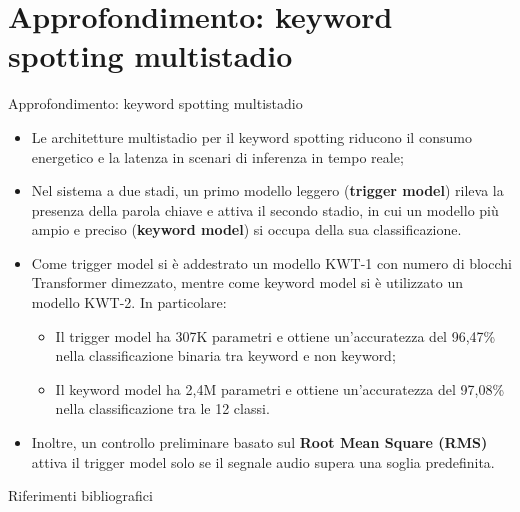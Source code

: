 \documentclass[aspectratio=169]{beamer}
\begin{document}
\section{Approfondimento: keyword spotting multistadio}

\begin{frame}{Approfondimento: keyword spotting multistadio}
  \begin{itemize}
    \item Le architetture multistadio per il keyword spotting riducono il consumo energetico e la latenza in scenari di inferenza in tempo reale;
    \item Nel sistema a due stadi, un primo modello leggero (\textbf{trigger model}) rileva la presenza della parola chiave e attiva il secondo stadio, in cui un modello più ampio e preciso (\textbf{keyword model}) si occupa della sua classificazione.
    \item Come trigger model si è addestrato un modello KWT-1 con numero di blocchi Transformer dimezzato, mentre come keyword model si è utilizzato un modello KWT-2. In particolare:
    \begin{itemize}
      \item Il trigger model ha 307K parametri e ottiene un'accuratezza del 96,47\% nella classificazione binaria tra keyword e non keyword;
      \item Il keyword model ha 2,4M parametri e ottiene un'accuratezza del 97,08\% nella classificazione tra le 12 classi.
    \end{itemize}
    \item Inoltre, un controllo preliminare basato sul \textbf{Root Mean Square (RMS)} attiva il trigger model solo se il segnale audio supera una soglia predefinita.
  \end{itemize}
\end{frame}

\begin{frame}{Riferimenti bibliografici}
    
    
\end{frame}
\end{document}
